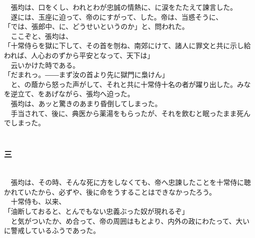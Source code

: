 \documentclass[
  paper=a5,
  fontsize=10pt,
  jafontsize=9.5pt,
  tate,                  %
  open_bracket_pos=nibu, %
]{jlreq}
\begin{document}
　張均は、口をくし、われとわが忠誠の情熱に、に涙をたたえて諫言した。\\


　遂には、玉座に迫って、帝のにすがって、した。帝は、当惑そうに、\\


「では、張郎中、に、どうせいというのか」と、問われた。\\


　ここぞと、張均は、\\


「十常侍らを獄に下して、その首を刎ね、南郊にけて、諸人に罪文と共に示し給われば、人心おのずから平安となって、天下は」\\


　云いかけた時である。\\


「だまれっ。――まず汝の首より先に獄門に梟けん」\\


　と、の蔭から怒った声がして、それと共に十常侍十名の者が躍り出した。みなを逆立て、をあげながら、張均へ迫った。\\


　張均は、あッと驚きのあまり昏倒してしまった。\\


　手当されて、後に、典医から薬湯をもらったが、それを飲むと眠ったまま死んでしまった。\\

\\

\subsubsection{三}

\\


　張均は、その時、そんな死に方をしなくても、帝へ忠諫したことを十常侍に聴かれていたから、必ずや、後に命をうすることはできなかったろう。\\


　十常侍も、以来、\\


「油断しておると、とんでもない忠義ぶった奴が現れるぞ」\\


　と気がついたか、め合って、帝の周囲はもとより、内外の政にわたって、大いに警戒しているふうであった。\\
\end{document}
